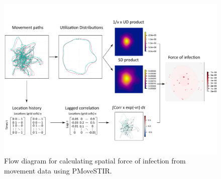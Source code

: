 \documentclass[letterpaper]{article}
\begin{document}
 \begin{figure}
     \includegraphics[width=\textwidth]{figures/steps_diagram.pdf}
     \caption{Flow diagram for calculating spatial force of infection from movement data using PMoveSTIR.}
 	\label{fig:steps}
 \end{figure}
\end{document}
